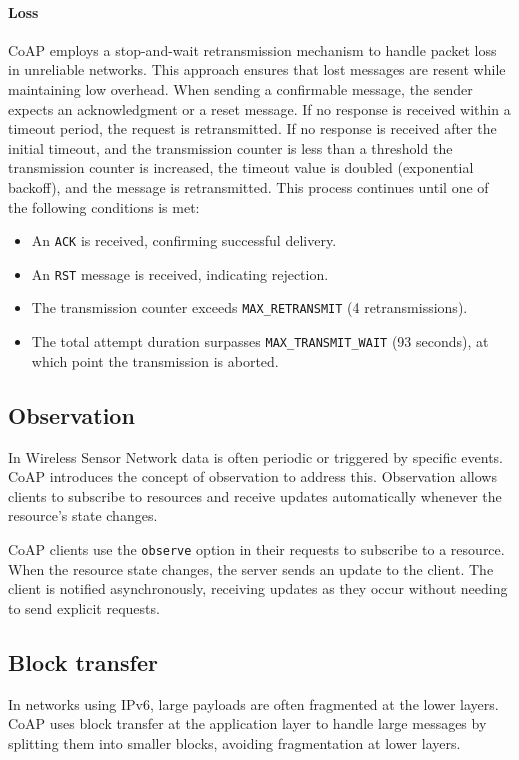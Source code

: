 \paragraph*{Loss}
CoAP employs a stop-and-wait retransmission mechanism to handle packet loss in unreliable networks. 
This approach ensures that lost messages are resent while maintaining low overhead.
When sending a confirmable message, the sender expects an acknowledgment or a reset message. 
If no response is received within a timeout period, the request is retransmitted.
If no response is received after the initial timeout, and the transmission counter is less than a threshold the transmission counter is increased, the timeout value is doubled (exponential backoff), and the message is retransmitted.
This process continues until one of the following conditions is met:
\begin{itemize}
    \item An \texttt{ACK} is received, confirming successful delivery.
    \item An \texttt{RST} message is received, indicating rejection.
    \item The transmission counter exceeds \texttt{MAX\_RETRANSMIT} (4 retransmissions).
    \item The total attempt duration surpasses \texttt{MAX\_TRANSMIT\_WAIT} (93 seconds), at which point the transmission is aborted.
\end{itemize}

\subsection{Observation}
In Wireless Sensor Network data is often periodic or triggered by specific events.
CoAP introduces the concept of observation to address this. 
Observation allows clients to subscribe to resources and receive updates automatically whenever the resource's state changes.

CoAP clients use the \texttt{observe} option in their requests to subscribe to a resource.
When the resource state changes, the server sends an update to the client.
The client is notified asynchronously, receiving updates as they occur without needing to send explicit requests.

\subsection{Block transfer}
In networks using IPv6, large payloads are often fragmented at the lower layers. 
CoAP uses block transfer at the application layer to handle large messages by splitting them into smaller blocks, avoiding fragmentation at lower layers.

